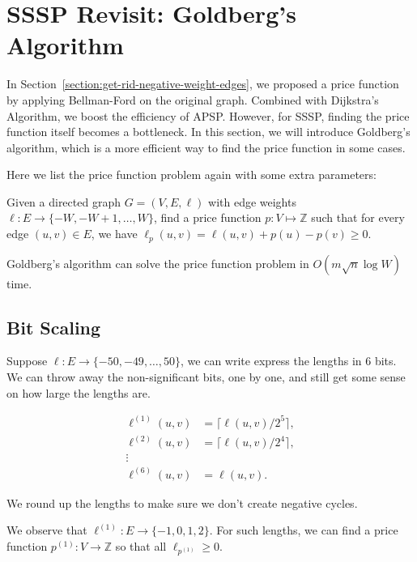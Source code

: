 \chapter{SSSP Revisit: Goldberg's Algorithm}

In Section~\ref{section:get-rid-negative-weight-edges}, we proposed a price function by applying Bellman-Ford on the original graph. Combined with Dijkstra's Algorithm, we boost the efficiency of APSP. However, for SSSP, finding the price function itself becomes a bottleneck. In this section, we will introduce Goldberg's algorithm, which is a more efficient way to find the price function in some cases.

Here we list the price function problem again with some extra parameters:
\begin{problem}
	Given a directed graph $G = (V, E, \ell)$ with edge weights $\ell: E\to \{-W, -W+1, \ldots, W\}$, find a price function $p: V\mapsto \mathbb{Z}$ such that for every edge $(u, v)\in E$, we have $\ell_p(u,v) = \ell(u,v) + p(u) - p(v) \geq 0$.
\end{problem}
\begin{theorem}
	Goldberg's algorithm can solve the price function problem in $O(m\sqrt{n}\log W)$ time.
\end{theorem}

\section{Bit Scaling}
Suppose $\ell: E\to \{-50, -49,\ldots, 50\}$, we can write express the lengths in 6 bits. We can throw away the non-significant bits, one by one, and still get some sense on how large the lengths are.

\begin{align*}
	\ell^{(1)}(u,v) & = \lceil \ell(u,v)/2^5 \rceil, \\
	\ell^{(2)}(u,v) & = \lceil \ell(u,v)/2^4 \rceil, \\
	\vdots          &                                \\
	\ell^{(6)}(u,v) & = \ell(u,v).
\end{align*}

\begin{note}
	We round up the lengths to make sure we don't create negative cycles.
\end{note}

We observe that $\ell^{(1)}: E\to \{-1,0,1,2\}$.
For such lengths, we can find a price function $p^{(1)}: V\to \mathbb{Z}$ so that all $\ell_{p^{(1)}}\ge 0$.

